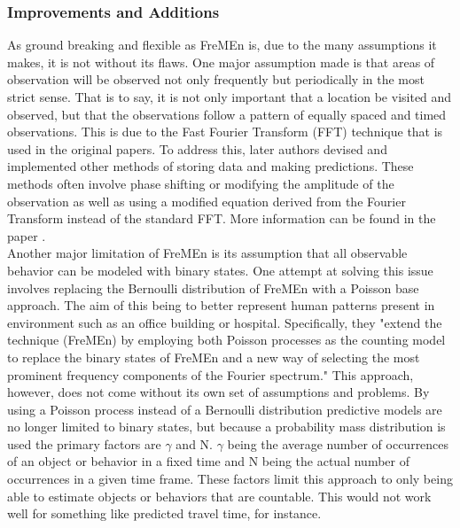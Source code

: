   \subsubsection{ Improvements and Additions }

  As ground breaking and flexible as FreMEn is, due to the many assumptions
  it makes, it is not without its flaws. One major assumption made is that areas of
  observation will be observed not only frequently but periodically in the most
  strict sense. That is to say, it is not only important that a location be
  visited and observed, but that the observations follow a pattern of equally
  spaced and timed observations. This is due to the Fast Fourier Transform (FFT)
  technique that is used in the original papers. To address this, later authors devised and
  implemented other methods of storing data and making predictions. These methods often
  involve phase shifting or modifying the amplitude of the observation as well
  as using a modified equation derived from the Fourier Transform instead of the
  standard FFT. More information can be found in the paper \cite{Santos2016}. \\

  Another major limitation of FreMEn is its assumption that all observable
  behavior can be modeled with binary states. One attempt at solving this issue
  involves replacing the Bernoulli distribution of FreMEn with a Poisson base approach.
  The aim of this being to
  better represent human patterns present in environment such as
  an office building or hospital. Specifically, they "extend the technique
  (FreMEn) by employing both Poisson processes as the counting model to replace
  the binary states of FreMEn and a new way of selecting the most prominent
  frequency components of the Fourier spectrum."\cite{Jovan2016} This approach,
  however, does not come without its own set of assumptions and problems. By
  using a Poisson process instead of a Bernoulli distribution predictive models are no longer
  limited to binary states, but because a probability mass distribution is used
  the primary factors are $\gamma$ and N. $\gamma$ being the average number of
  occurrences of an object or behavior in a fixed time and N being the actual
  number of occurrences in a given time frame. These factors limit this
  approach to only being able to estimate objects or behaviors that are
  countable. This would not work well for something like predicted travel time,
  for instance. \\

